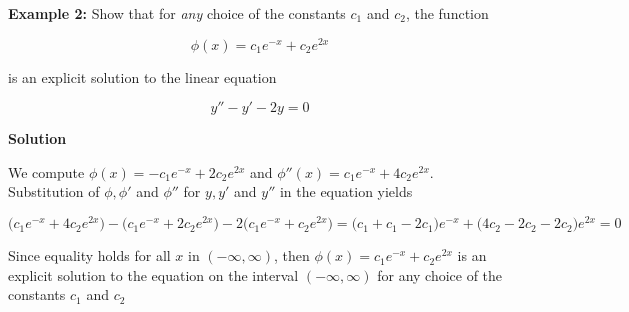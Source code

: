 \nopagenumbers
{\bf Example 2:} Show that for {\it any} choice of the constants $c_1$ and $c_2$, the function

$$\phi(x)=c_1e^{-x}+c_2e^{2x}$$

is an explicit solution to the linear equation

$$y''-y'-2y=0$$

\vskip 10pt
{\bf Solution}

\vskip 6pt
We compute $\phi(x)=-c_1e^{-x}+2c_2e^{2x}$ and $\phi''(x)=c_1e^{-x}+4c_2e^{2x}$. Substitution of $\phi,\phi'$ and $\phi''$ for $y,y'$ and $y''$ in the equation yields

$$\bigl(c_1e^{-x}+4c_2e^{2x}\bigr)-\bigl(c_1e^{-x}+2c_2e^{2x}\bigr)-2\bigl(c_1e^{-x}+c_2e^{2x}\bigr)=\bigl(c_1+c_1-2c_1\bigr)e^{-x}+\bigl(4c_2-2c_2-2c_2\bigr)e^{2x}=0$$

Since equality holds for all $x$ in $(-\infty,\infty)$, then $\phi(x)=c_1e^{-x}+c_2e^{2x}$ is an explicit solution to the equation on the interval $(-\infty,\infty)$ for any choice of the constants $c_1$ and $c_2$

\vfill\eject
\bye
